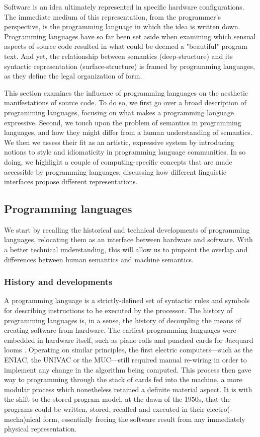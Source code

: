 Software is an idea ultimately represented in specific hardware configurations. The immediate medium of this representation, from the programmer's perspective, is the programming language in which the idea is written down. Programming languages have so far been set aside when examining which sensual aspects of source code resulted in what could be deemed a "beautiful" program text. And yet, the relationship between semantics (deep-structure)  and its syntactic representation (surface-structure) is framed by programming languages, as they define the legal organization of form.

This section examines the influence of programming languages on the aesthetic manifestations of source code. To do so, we first go over a broad description of programming languages, focusing on what makes a programming language expressive. Second, we touch upon the problem of semantics in programming languages, and how they might differ from a human understanding of semantics. We then we assess their fit as an artistic, expressive system by introducing notions to style and idiomaticity in programming language communities. In so doing, we highlight a couple of computing-specific concepts that are made accessible by programming languages, discussing how different linguistic interfaces propose different representations.

\subsection{Programming languages}
\label{subsec:programming-languages}

We start by recalling the historical and technical developments of programming languages, relocating them as an interface between hardware and software. With a better technical understanding, this will allow us to pinpoint the overlap and differences between human semantics and machine semantics.

\subsubsection{History and developments}
\label{subsubsec:history-developments}

A programming language is a strictly-defined set of syntactic rules and symbols for describing instructions to be executed by the processor. The history of programming languages is, in a sense, the history of decoupling the means of creating software from hardware. The earliest programming languages were embedded in hardware itself, such as piano rolls and punched cards for Jacquard looms \citep{sack_software_2019}. Operating on similar principles, the first electric computers—such as the ENIAC, the UNIVAC or the MUC—still required manual re-wiring in order to implement any change in the algorithm being computed. This process then gave way to programming through the stack of cards fed into the machine, a more modular process which nonetheless retained a definite material aspect. It is with the shift to the stored-program model, at the dawn of the 1950s, that the programs could be written, stored, recalled and executed in their electro(-mecha)nical form, essentially freeing the software result from any immediately physical representation.

